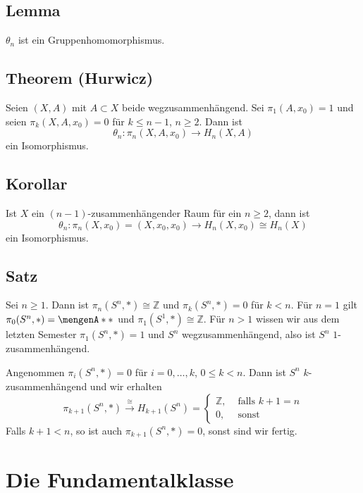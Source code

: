 \subsection{Lemma} %
\label{sub:1522}
$\theta_n$ ist ein Gruppenhomomorphismus.

\subsection{Theorem (Hurwicz)} %
\label{sub:1523}
Seien $(X,A)$ mit $A \subset X$ beide wegzusammenhängend. Sei $\pi_1(A,x_0)=1$ und seien $\pi_k(X,A,x_0)=0$ für $k \le n-1$, $n \ge 2$. Dann ist 
\[
	\theta_n \colon \pi_n(X,A,x_0) \longrightarrow H_n(X,A)
\]
ein Isomorphismus.

\subsection{Korollar} %
\label{sub:1524}
Ist $X$ ein $(n-1)$-zusammenhängender Raum für ein $n \ge 2$, dann ist 
\[
	\theta_n \colon \pi_n(X,x_0)=(X,x_0,x_0) \longrightarrow H_n(X,x_0)\cong H_n(X)
\]
ein Isomorphismus.

\subsection{Satz} %
\label{sub:1525}
Sei $n \ge 1$. Dann ist $\pi_n(S^n,*)\cong \mathds{Z}$ und $\pi_k(S^n,*)=0$ für $k <n$.
Für $n=1$ gilt $\pi_0(S^n,*)= \set{*}$ und $\pi_1(S^1,*)\cong \mathds{Z}$. Für $n>1$ wissen wir aus dem letzten Semester $\pi_1(S^n,*)=1$ und $S^n$ wegzusammenhängend, also
ist $S^n$ $1$-zusammenhängend.

Angenommen $\pi_i(S^n,*)=0$ für $i=0,\ldots ,k$, $0 \le k < n$. Dann ist $S^n$ $k$-zusammenhängend und wir erhalten 
\[
	\pi_{k+1}(S^n,*) \xrightarrow{\cong} H_{k+1}(S^n)= \begin{cases}
		\mathds{Z}, &\text{ falls }k+1=n\\
		0 , &\text{ sonst}
	\end{cases}
\]
Falls $k+1<n$, so ist auch $\pi_{k+1}(S^n,*)=0$, sonst sind wir fertig. \bewende
\newpage
\section{Die Fundamentalklasse} %
\label{sec:16}
